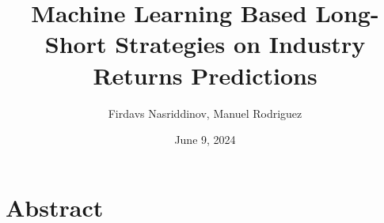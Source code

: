 \documentclass{article}
\title{Machine Learning Based Long-Short Strategies on Industry Returns Predictions}
\author{Firdavs Nasriddinov, Manuel Rodriguez}
\date{June 9, 2024}
\begin{document}
\maketitle{}

\section{Abstract}

\end{document}
